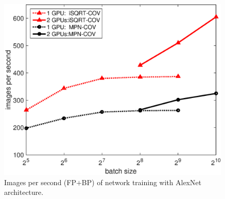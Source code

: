 \documentclass[10pt,twocolumn,letterpaper]{article}
\makeatletter
\newcommand\tabcaption{\def\@captype{table}\caption}
\makeatother
\begin{document}
\begin{table}[t]
	\caption{Comparison of time and memory usage with AlexNet architecture. The size of covariance matrix is $256\times 256$.}
	\label{table:time-comparison}
\end{table}




\begin{figure}[thb]
\vspace{2pt}
\setlength\tabcolsep{8pt}
\renewcommand{\baselinestretch}{1.0}
\footnotesize
\centering
\begin{minipage}[b]{0.65\linewidth}
\centering
\includegraphics[width=1.0\textwidth]{singleGPU_twoGPUs.eps}
\end{minipage}
\caption{Images per second (FP$+$BP) of network training with AlexNet architecture.}
\label{fig:Comparison_time}
\end{figure}
\end{document}
